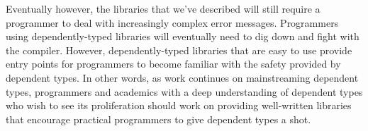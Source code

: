Eventually however, the libraries that we've described will still require a
programmer to deal with increasingly complex error messages. Programmers using
dependently-typed libraries will eventually need to dig down and fight with the
compiler. However, dependently-typed libraries that are easy to use provide
entry points for programmers to become familiar with the safety provided by
dependent types. In other words, as work continues on mainstreaming dependent
types, programmers and academics with a deep understanding of dependent types
who wish to see its proliferation should work on providing well-written
libraries that encourage practical programmers to give dependent types a shot.